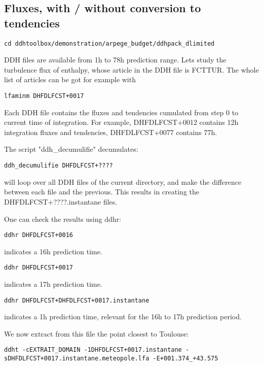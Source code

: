 \subsection{Fluxes, with / without conversion to tendencies}
{\small \begin{verbatim} 
cd ddhtoolbox/demonstration/arpege_budget/ddhpack_dlimited
\end{verbatim}}

\noi DDH files are available from 1h to 78h prediction range. Lets study the turbulence flux of enthalpy, whose article in the DDH file is FCTTUR. The whole list of articles can be got for example with

{\small \begin{verbatim} 
lfaminm DHFDLFCST+0017
\end{verbatim}}

\p Each DDH file contains the fluxes and tendencies cumulated from step 0 to current time of integration. For example, DHFDLFCST+0012 contains 12h integration fluxes and tendencies, DHFDLFCST+0077 contains 77h.

\p The script "ddh\_decumulifie" decumulates:

{\small \begin{verbatim} 
ddh_decumulifie DHFDLFCST+????
\end{verbatim}}
\noi will loop over all DDH files of the current directory, and make the difference between each file and the previous. This results in creating the DHFDLFCST+????.instantane files.

\p One can check the results using ddhr:
{\small \begin{verbatim} 
ddhr DHFDLFCST+0016
\end{verbatim}}
\noi indicates a 16h prediction time.
{\small \begin{verbatim} 
ddhr DHFDLFCST+0017
\end{verbatim}}
\noi indicates a 17h prediction time.
{\small \begin{verbatim} 
ddhr DHFDLFCST+DHFDLFCST+0017.instantane
\end{verbatim}}
\noi indicates a 1h prediction time, relevant for the 16h to 17h prediction period.

\p We now extract from this file the point closest to Toulouse:
{\tiny \begin{verbatim} 
ddht -cEXTRAIT_DOMAIN -1DHFDLFCST+0017.instantane -sDHFDLFCST+0017.instantane.meteopole.lfa -E+001.374_+43.575
\end{verbatim}}

